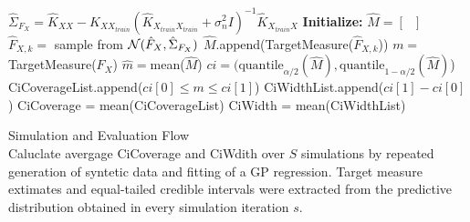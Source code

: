 \begin{algorithm}[h!]
\begin{algorithmic}[1]
        \State $\hat{\Sigma}_{F_X} = \hat{K}_{XX} -\hat{K}_{XX_{train}}(\hat{K}_{X_{train}X_{train}} + \sigma_n^2 I)^{-1}\hat{K}_{X_{train}X}$ 
        \State \textbf{Initialize:} $\hat{M} = \left[ \text{ } \right]$
            \State $\hat{F}_{X,k} = $ sample from $\operatorname{\mathcal{N}}(\hat{F}_X, \hat{\Sigma}_{F_X} )$ 
            \State $\hat{M}$.append(TargetMeasure($\hat{F}_{X, k}$)) 
        \EndFor
    \State $m =$ TargetMeasure($F_X$) 
    \State $\hat{m} = $mean($\hat{M}$)
    \State $ci = (\text{quantile}_{\alpha/2}(\hat{M}), \text{quantile}_{1-\alpha/2}(\hat{M})$) 
    \State CiCoverageList.append($ ci\left[ 0 \right] \leq m \leq ci\left[ 1 \right]$)
    \State CiWidthList.append($ci\left[ 1 \right] - ci\left[ 0 \right] $)
    \EndFor
    \State CiCoverage = mean(CiCoverageList)
    \State CiWidth = mean(CiWidthList)
\end{algorithmic}
 \caption[Simulation and Evaluation Flow]{Simulation and Evaluation Flow \\
 Caluclate avergage CiCoverage and CiWdith over $S$ simulations by
repeated generation of syntetic data and fitting of a GP regression.
Target measure extimates and equal-tailed credible intervals were extracted from the
predictive distribution obtained in every simulation iteration $s$.}
 \label{pc:simulation-evaluation-flow}


\end{algorithm}






